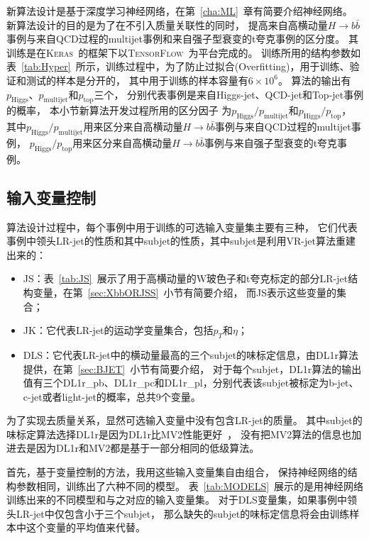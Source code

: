 
新算法设计是基于深度学习神经网络，在第~\ref{cha:ML}~章有简要介绍神经网络。
新算法设计的目的是为了在不引入质量关联性的同时，
提高来自高横动量$H\rightarrow b\bar{b}$事例与来自QCD过程的multijet事例和来自强子型衰变的t夸克事例的区分度。
其训练是在\textsc{Keras}~\cite{Chollet:2015}的框架下以\textsc{TensorFlow}~\cite{Tensorflow:2015}为平台完成的。
训练所用的结构参数如表~\ref{tab:Hyper}~所示，训练过程中，为了防止过拟合(Overfitting)，用于训练、验证和测试的样本是分开的，
其中用于训练的样本容量有$6\times 10^{6}$。
算法的输出有$p_{\text{Higgs}}$、$p_{\text{multijet}}$和$p_{\text{top}}$三个，
分别代表事例是来自Higgs-jet、QCD-jet和Top-jet事例的概率，
本小节新算法开发过程所用的区分因子
为$p_{\text{Higgs}}/p_{\text{multijet}}$和$p_{\text{Higgs}}/p_{\text{top}}$，
其中$p_{\text{Higgs}}/p_{\text{multijet}}$用来区分来自高横动量$H\rightarrow b\bar{b}$事例与来自QCD过程的multijet事例，
$p_{\text{Higgs}}/p_{\text{top}}$用来区分来自高横动量$H\rightarrow b\bar{b}$事例与来自强子型衰变的t夸克事例。


\subsection{输入变量控制}
\label{sec:XbbTagger1}

算法设计过程中，每个事例中用于训练的可选输入变量集主要有三种，
它们代表事例中领头LR-jet的性质和其中subjet的性质，其中subjet是利用VR-jet算法重建出来的：
\begin{itemize}
       \item JS：表~\ref{tab:JS}~展示了用于高横动量的W玻色子和t夸克标定的部分LR-jet结构变量，在第~\ref{sec:XbbORJSS}~小节有简要介绍，
       而JS表示这些变量的集合；
       \item JK：它代表LR-jet的运动学变量集合，包括$p_{T}$和$\eta$；
       \item DLS：它代表LR-jet中的横动量最高的三个subjet的味标定信息，由DL1r算法提供，在第~\ref{sec:BJET}~小节有简要介绍，
       对于每个subjet，DL1r算法的输出值有三个DL1r\_pb、DL1r\_pc和DL1r\_pl，分别代表该subjet被标定为b-jet、c-jet或者light-jet的概率，总共9个变量。
\end{itemize}
为了实现去质量关系，显然可选输入变量中没有包含LR-jet的质量。
其中subjet的味标定算法选择DL1r是因为DL1r比MV2性能更好~\cite{DLOR2}，
没有把MV2算法的信息也加进去是因为DL1r和MV2都是基于一部分相同的低级算法。

首先，基于变量控制的方法，我用这些输入变量集自由组合，
保持神经网络的结构参数相同，训练出了六种不同的模型。
表~\ref{tab:MODELS}~展示的是用神经网络训练出来的不同模型和与之对应的输入变量集。
对于DLS变量集，如果事例中领头LR-jet中仅包含小于三个subjet，
那么缺失的subjet的味标定信息将会由训练样本中这个变量的平均值来代替。

